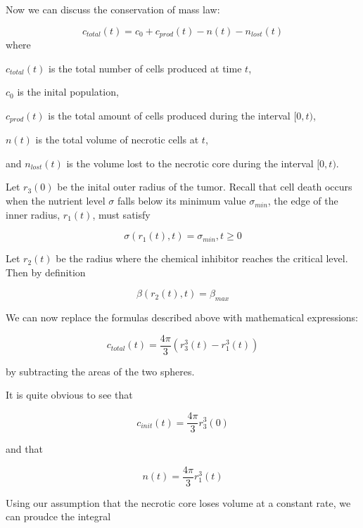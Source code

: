 \documentclass{article}
\begin{document}
Now we can discuss the conservation of mass law:

\begin{equation}
    c_{total}(t) = c_0 + c_{prod}(t) - n(t) - n_{lost}(t)
    \label{eq:conservation}
\end{equation}
where

$c_{total}(t)$ is the total number of cells produced at time $t$,

$c_0$ is the inital population,

$c_{prod}(t)$ is the total amount of cells produced during the interval $[0, t)$,

$n(t)$ is the total volume of necrotic cells at $t$,

and $n_{lost}(t)$ is the volume lost to the necrotic core during the interval $[0, t)$.

Let $r_3(0)$ be the inital outer radius of the tumor. Recall that cell death occurs when the nutrient level $\sigma$ falls below
its minimum value $\sigma_{min}$, the edge of the inner radius, $r_1(t)$, must satisfy

\begin{equation}
    \sigma(r_1(t), t) = \sigma_{min}, t \geq 0
\end{equation}

Let $r_2(t)$ be the radius where the chemical inhibitor reaches the critical level. Then by definition

\begin{equation}
    \beta(r_2(t), t) = \beta_{max}
\end{equation}

We can now replace the formulas described above with mathematical expressions:

\begin{equation}
    c_{total}(t) = \frac{4\pi}{3}(r_3^3(t) - r_1^3(t))
\end{equation}

by subtracting the areas of the two spheres.

It is quite obvious to see that

\begin{equation}
    c_{init}(t) = \frac{4\pi}{3}r_3^3(0)
\end{equation}

and that

\begin{equation}
    n(t) = \frac{4\pi}{3}r_1^3(t)
\end{equation}

Using our assumption that the necrotic core loses volume at a constant rate, we can proudce the integral
\end{document}
